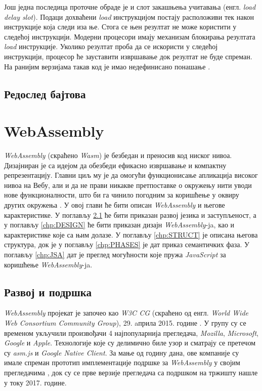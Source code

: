 \documentclass[12pt,oneside]{memoir}
\begin{document}
Још једна последица проточне обраде је и слот закашњења учитавања (енгл. \textit{load delay slot}). Подаци дохваћени
\textit{load} инструкцијом постају расположиви тек након инструкције која следи иза ње. Стога се њен резултат не
може користити у следећој инструкцији. Модерни процесори имају механизам блокирања резултата \textit{load}
инструкције. Уколико резултат проба да се искористи у следећој инструкцији, процесор ће зауставити извршавање док
резултат не буде спреман. На ранијим верзијама такав код је имао недефинисано понашање \cite{SMR}.

\section{Редослед бајтова} \label{chp:ENDIANNESS}

\chapter{WebAssembly}

\textit{WebAssembly} (скраћено \textit{Wasm}) је безбедан и преносив код ниског нивоа. Дизајниран је са
идејом да обезбеди ефикасно извршавање и компактну репрезентацију. Главни циљ му је да омогући функционисање
апликација високог нивоа на Вебу, али и да не прави никакве претпоставке о окружењу нити уводи нове функционалности,
што би га чинило погодним за коришћење у оквиру других окружења \cite{WASMS}. У овој глави ће бити описан
\textit{WebAssembly} и његове карактеристике. У поглављу \ref{chp:SUPP} ће бити приказан развој језика и заступљеност, а
у поглављу \ref{chp:DESIGN} ће бити приказан дизајн \textit{WebAssembly}-ja, као и карактеристике које са њим долазе.
У поглављу \ref{chp:STRUCT} је описана његова структура, док је у поглављу \ref{chp:PHASES} је дат приказ семантичких
фаза. У поглављу \ref{chp:JSA} дат је преглед могућности које пружа \textit{JavaScript} за коришћење
\textit{WebAssembly}-ja.

\section{Развој и подршка} \label{chp:SUPP}

\textit{WebAssembly} пројекат је започео као \textit{W3C CG} (скраћено од енгл. \textit{World Wide Web Consortium Community Group}),
29. aприла 2015. године \cite{WASMCG}. У групу су се временом укључили произвођачи 4 најпопуларнија прегледача, \textit{Mozilla},
\textit{Microsoft}, \textit{Google} и \textit{Apple}. Технологије које су делимично биле узор и сматрају се претечом су \textit{asm.js} и
\textit{Google Native Client}. За мање од годину дана, ове компаније су имале спреман прототип имплементације
подршке за \textit{WebAssembly} у својим прегледачима \cite{WASMEXP}, док су се прве верзије прегледача са подршком на тржишту нашле у току
2017. године.
\end{document}
